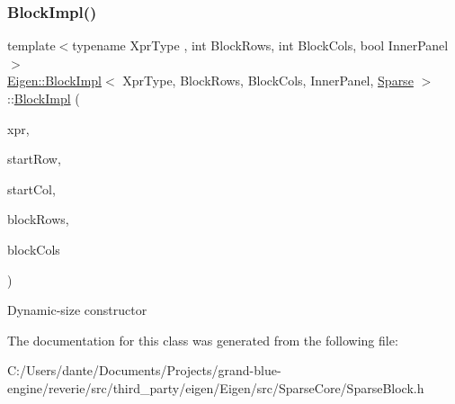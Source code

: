 \subsubsection{\texorpdfstring{BlockImpl()}{BlockImpl()}\hspace{0.1cm}{\footnotesize\ttfamily [2/2]}}
{\footnotesize\ttfamily template$<$typename Xpr\+Type , int Block\+Rows, int Block\+Cols, bool Inner\+Panel$>$ \\
\mbox{\hyperlink{class_eigen_1_1_block_impl}{Eigen\+::\+Block\+Impl}}$<$ Xpr\+Type, Block\+Rows, Block\+Cols, Inner\+Panel, \mbox{\hyperlink{struct_eigen_1_1_sparse}{Sparse}} $>$\+::\mbox{\hyperlink{class_eigen_1_1_block_impl}{Block\+Impl}} (\begin{DoxyParamCaption}\item[{Xpr\+Type \&}]{xpr,  }\item[{\mbox{\hyperlink{struct_eigen_1_1_eigen_base_a554f30542cc2316add4b1ea0a492ff02}{Index}}}]{start\+Row,  }\item[{\mbox{\hyperlink{struct_eigen_1_1_eigen_base_a554f30542cc2316add4b1ea0a492ff02}{Index}}}]{start\+Col,  }\item[{\mbox{\hyperlink{struct_eigen_1_1_eigen_base_a554f30542cc2316add4b1ea0a492ff02}{Index}}}]{block\+Rows,  }\item[{\mbox{\hyperlink{struct_eigen_1_1_eigen_base_a554f30542cc2316add4b1ea0a492ff02}{Index}}}]{block\+Cols }\end{DoxyParamCaption})\hspace{0.3cm}{\ttfamily [inline]}}

Dynamic-\/size constructor 

The documentation for this class was generated from the following file\+:\begin{DoxyCompactItemize}
\item 
C\+:/\+Users/dante/\+Documents/\+Projects/grand-\/blue-\/engine/reverie/src/third\+\_\+party/eigen/\+Eigen/src/\+Sparse\+Core/Sparse\+Block.\+h\end{DoxyCompactItemize}
